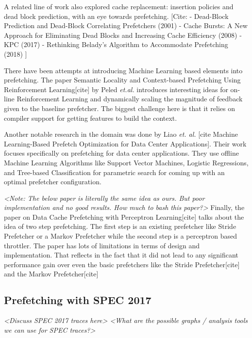 \documentclass{sig-alternate}
\begin{document}
A related line of work also explored cache replacement: insertion policies and dead block prediction, with an eye towards prefetching. [Cite:\newline
- Dead-Block Prediction and Dead-Block Correlating Prefetchers (2001)\newline
- Cache Bursts: A New Approach for Eliminating Dead Blocks and Increasing Cache Efficiency (2008)\newline
- KPC (2017)\newline
- Rethinking Belady's Algorithm to Accommodate Prefetching (2018)\newline
]

There have been attempts at introducing Machine Learning based elements into prefetching. 
The paper Semantic Locality and Context-based Prefetching Using Reinforcement Learning[cite] by Peled \textit{et.al.} introduces interesting ideas for on-line Reinforcement Learning and dynamically scaling the magnitude of feedback given to the baseline prefetcher. 
The biggest challenge here is that it relies on compiler support for getting features to build the context.

Another notable research in the domain was done by Liao \textit{et. al.} [cite Machine Learning-Based Prefetch Optimization for Data Center Applications].
Their work focuses specifically on prefetching for data center applications. 
They use offline Machine Learning Algorithms like Support Vector Machines, Logistic Regressions, and Tree-based Classification for parametric search for coming up with an optimal prefetcher configuration.

\textit{<Note: The below paper is literally the same idea as ours. But poor implementation and no good results. How much to bash this paper?>}
Finally, the paper on Data Cache Prefetching with Perceptron Learning[cite] talks about the idea of two step prefetching.
The first step is an existing prefetcher like Stride Prefetcher or a Markov Prefetcher while the second step is a perceptron based throttler.
The paper has lots of limitations in terms of design and implementation.
That reflects in the fact that it did not lead to any significant performance gain over even the basic prefetchers like the Stride Prefetcher[cite] and the Markov Prefetcher[cite] 



\subsection{Prefetching with SPEC 2017}
\textit{<Discuss SPEC 2017 traces here>
<What are the possible graphs / analysis tools we can use for SPEC traces?>}
\end{document}
